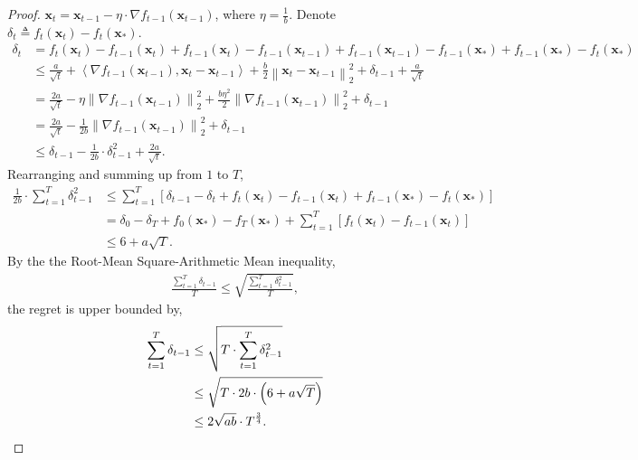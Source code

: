 \documentclass[10pt]{article}
\def\rvx{{\mathbf{x}}}
\begin{document}
\begin{proof}
$\rvx_{t} = \rvx_{t-1} - \eta \cdot \nabla f_{t-1}\left(\rvx_{t-1}\right)$, where $\eta = \frac{1}{b}$. Denote $\delta_t \triangleq f_t\left(\rvx_t\right) - f_t\left( \rvx_* \right)$.
\begin{equation*}
\begin{split}
    \delta_t &= f_t\left(\rvx_t\right) - f_{t-1}\left(\rvx_t\right) + f_{t-1}\left(\rvx_t\right) - f_{t-1}\left(\rvx_{t-1}\right) + f_{t-1}\left(\rvx_{t-1}\right) - f_{t-1}\left( \rvx_* \right) + f_{t-1}\left( \rvx_* \right) -  f_t\left( \rvx_* \right) \\
    &\le \frac{a}{\sqrt{t}} + \left\langle \nabla f_{t-1}\left(\rvx_{t-1}\right),  \rvx_t - \rvx_{t-1} \right\rangle + \frac{b}{2}\left\| \rvx_t - \rvx_{t-1} \right\|_2^2 + \delta_{t-1} + \frac{a}{\sqrt{t}} \\
    &= \frac{2a}{\sqrt{t}} - \eta \left\| \nabla f_{t-1}\left(\rvx_{t-1}\right) \right\|_2^2 + \frac{b \eta^2}{2} \left\| \nabla f_{t-1}\left(\rvx_{t-1}\right)  \right\|_2^2 + \delta_{t-1} \\
    &= \frac{2a}{\sqrt{t}} - \frac{1}{2b} \left\| \nabla f_{t-1}\left(\rvx_{t-1}\right) \right\|_2^2 + \delta_{t-1} \\
    &\le \delta_{t-1} - \frac{1}{2b} \cdot \delta_{t-1}^2 + \frac{2a}{\sqrt{t}}.
\end{split}
\end{equation*}
Rearranging and summing up from $1$ to $T$,
\begin{equation*}
\begin{split}
    \frac{1}{2b} \cdot \sum\limits_{t=1}^{T}{ \delta_{t-1}^2} &\le \sum\limits_{t=1}^{T}{\left[ \delta_{t-1} - \delta_{t} + f_t\left(\rvx_t\right) - f_{t-1}\left(\rvx_t\right) + f_{t-1}\left( \rvx_* \right) -  f_t\left( \rvx_* \right) \right] } \\
    &= \delta_0 - \delta_{T} + f_0\left( \rvx_* \right) - f_{T}\left( \rvx_* \right) + \sum\limits_{t=1}^{T}{ \left[ f_t\left(\rvx_t\right) - f_{t-1}\left(\rvx_t\right) \right] } \\
    &\le 6 + a \sqrt{T}.
\end{split}
\end{equation*}
By the the Root-Mean Square-Arithmetic Mean inequality,
\begin{equation*}
\begin{split}
    \frac{\sum\limits_{t=1}^{T}{ \delta_{t-1}}}{T} \le \sqrt{\frac{\sum\limits_{t=1}^{T}{ \delta_{t-1}^2}}{T}},
\end{split}
\end{equation*}
the regret is upper bounded by,
\begin{equation*}
\begin{split}
    \sum\limits_{t=1}^{T}{ \delta_{t-1}} &\le \sqrt{ T \cdot \sum\limits_{t=1}^{T}{ \delta_{t-1}^2} } \\
    &\le \sqrt{ T \cdot 2b \cdot \left( 6 + a \sqrt{T} \right) } \\
    &\le 2 \sqrt{ab} \cdot T^{\frac{3}{4}}. \qedhere
\end{split}
\end{equation*}
\end{proof}
\end{document}
